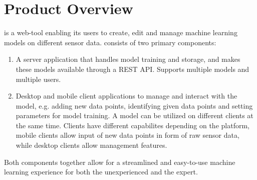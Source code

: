 \section{Product Overview}

 {\pseProjectName} is a web-tool enabling its users to create, edit and manage machine learning models on different sensor data. {\pseProjectName} consists of two primary components:

\begin{enumerate}
    \item A server application that handles model training and storage, and makes these models available through a REST API. Supports multiple models and multiple users.
    \item Desktop and mobile client applications to manage and interact with the model, e.g. adding new data points, identifying given data points and setting parameters for model training. A model can be utilized on different clients at the same time. Clients have different capabilites depending on the platform, mobile clients allow input of new data points in form of raw sensor data, while desktop clients allow management features. %
\end{enumerate}

Both components together allow for a streamlined and easy-to-use machine learning experience for both the unexperienced and the expert.